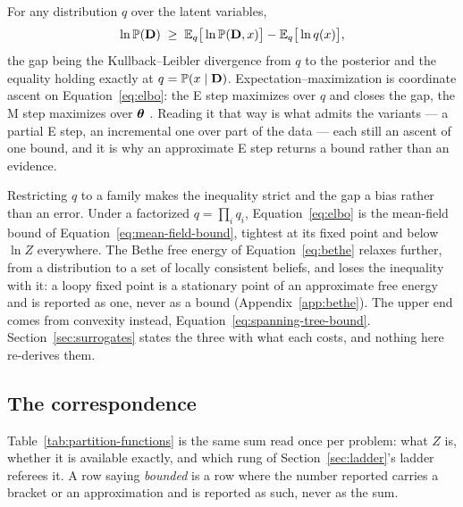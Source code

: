 \documentclass[11pt,a4paper]{article}
\begin{document}
For any distribution $q$ over the latent variables,
\begin{equation}
  \ln \mathbb{P}(\mathbf{D}) \;\ge\;
    \mathbb{E}_q \big[ \ln \mathbb{P}(\mathbf{D}, x) \big]
    - \mathbb{E}_q \big[ \ln q(x) \big],
  \label{eq:elbo}
\end{equation}
the gap being the Kullback--Leibler divergence from $q$ to the posterior and
the equality holding exactly at $q = \mathbb{P}(x \mid \mathbf{D})$.
Expectation--maximization is coordinate ascent on Equation~\ref{eq:elbo}: the E
step maximizes over $q$ and closes the gap, the M step maximizes over $\boldsymbol{\theta}$
\citep{neal1998}. Reading it that way is what admits the variants --- a partial
E step, an incremental one over part of the data --- each still an ascent of
one bound, and it is why an approximate E step returns a bound rather than an
evidence.

Restricting $q$ to a family makes the inequality strict and the gap a bias
rather than an error. Under a factorized $q = \prod_i q_i$,
Equation~\ref{eq:elbo} is the mean-field bound of
Equation~\ref{eq:mean-field-bound}, tightest at its fixed point and below
$\ln Z$ everywhere. The Bethe free energy of Equation~\ref{eq:bethe} relaxes
further, from a distribution to a set of locally consistent beliefs, and loses
the inequality with it: a loopy fixed point is a stationary point of an
approximate free energy and is reported as one, never as a bound
(Appendix~\ref{app:bethe}). The upper end comes from convexity instead,
Equation~\ref{eq:spanning-tree-bound}. Section~\ref{sec:surrogates} states the
three with what each costs, and nothing here re-derives them.

\subsection{The correspondence}

Table~\ref{tab:partition-functions} is the same sum read once per problem: what
$Z$ is, whether it is available exactly, and which rung of
Section~\ref{sec:ladder}'s ladder referees it. A row saying \emph{bounded} is a
row where the number reported carries a bracket or an approximation and is
reported as such, never as the sum.
\end{document}
